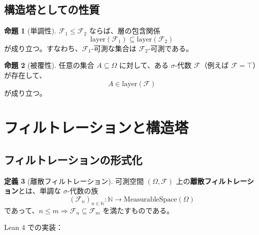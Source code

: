 \documentclass[12pt,a4paper]{article}
\theoremstyle{definition}
\newtheorem{definition}{定義}[section]
\newtheorem{proposition}[definition]{命題}
\newcommand{\N}{\mathbb{N}}
\newcommand{\cF}{\mathcal{F}}
\DeclareMathOperator{\generateFrom}{generateFrom}
\begin{document}
\begin{center}
\end{center}

\subsection{構造塔としての性質}

\begin{proposition}[単調性]
$\cF_1 \leq \cF_2$ ならば、層の包含関係
\[
\text{layer}(\cF_1) \subseteq \text{layer}(\cF_2)
\]
が成り立つ。すなわち、$\cF_1$-可測な集合は $\cF_2$-可測である。
\end{proposition}

\begin{proposition}[被覆性]
任意の集合 $A \subseteq \Omega$ に対して、ある $\sigma$-代数 $\cF$（例えば $\cF = \top$）が存在して、
\[
A \in \text{layer}(\cF)
\]
が成り立つ。
\end{proposition}

\section{フィルトレーションと構造塔}\label{sec:filtration}

\subsection{フィルトレーションの形式化}

\begin{definition}[離散フィルトレーション]
可測空間 $(\Omega, \cF)$ 上の\textbf{離散フィルトレーション}とは、単調な $\sigma$-代数の族
\[
(\cF_n)_{n \in \N} : \N \to \text{MeasurableSpace}(\Omega)
\]
であって、$n \leq m \Rightarrow \cF_n \subseteq \cF_m$ を満たすものである。
\end{definition}

Lean 4 での実装：
\end{document}
